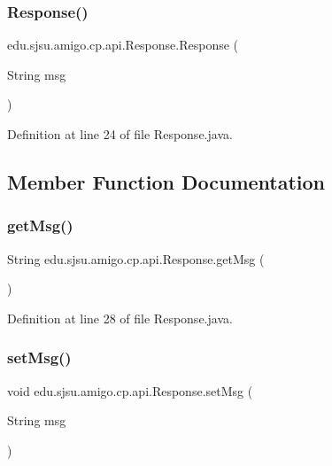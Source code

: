 \subsubsection{\texorpdfstring{Response()}{Response()}}
{\footnotesize\ttfamily edu.\+sjsu.\+amigo.\+cp.\+api.\+Response.\+Response (\begin{DoxyParamCaption}\item[{String}]{msg }\end{DoxyParamCaption})}



Definition at line 24 of file Response.\+java.



\subsection{Member Function Documentation}
\mbox{\label{classedu_1_1sjsu_1_1amigo_1_1cp_1_1api_1_1_response_ac99ad923c8efd03440fe0e4a2320b729}} 
\subsubsection{\texorpdfstring{get\+Msg()}{getMsg()}}
{\footnotesize\ttfamily String edu.\+sjsu.\+amigo.\+cp.\+api.\+Response.\+get\+Msg (\begin{DoxyParamCaption}{ }\end{DoxyParamCaption})}



Definition at line 28 of file Response.\+java.

\mbox{\label{classedu_1_1sjsu_1_1amigo_1_1cp_1_1api_1_1_response_ab662e711541d25f75f09b57666d72188}} 
\subsubsection{\texorpdfstring{set\+Msg()}{setMsg()}}
{\footnotesize\ttfamily void edu.\+sjsu.\+amigo.\+cp.\+api.\+Response.\+set\+Msg (\begin{DoxyParamCaption}\item[{String}]{msg }\end{DoxyParamCaption})}



